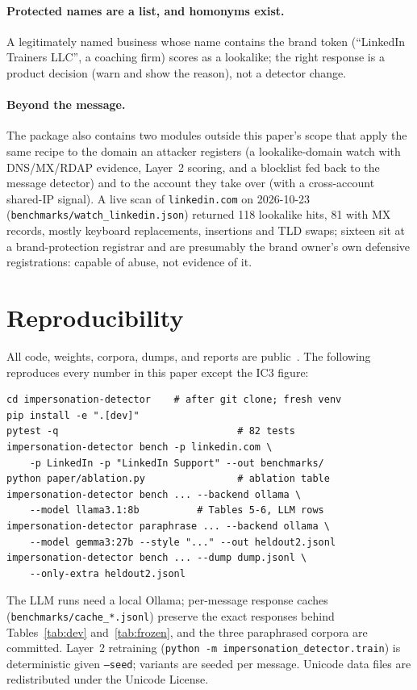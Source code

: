 \documentclass[10pt,twocolumn]{article}
\newcommand{\code}[1]{\texttt{#1}}
\begin{document}
\paragraph{Protected names are a list, and homonyms exist.} A legitimately named business whose name contains the brand token (``LinkedIn Trainers LLC'', a coaching firm) scores as a lookalike; the right response is a product decision (warn and show the reason), not a detector change.

\paragraph{Beyond the message.} The package also contains two modules outside this paper's scope that apply the same recipe to the domain an attacker registers (a lookalike-domain watch with DNS/MX/RDAP evidence, Layer~2 scoring, and a blocklist fed back to the message detector) and to the account they take over (with a cross-account shared-IP signal). A live scan of \code{linkedin.com} on 2026-10-23 (\code{benchmarks/watch\_linkedin.json}) returned 118 lookalike hits, 81 with MX records, mostly keyboard replacements, insertions and TLD swaps; sixteen sit at a brand-protection registrar and are presumably the brand owner's own defensive registrations: capable of abuse, not evidence of it.

\section{Reproducibility}
\label{sec:repro}

All code, weights, corpora, dumps, and reports are public~\cite{ezema2026detector}. The following reproduces every number in this paper except the IC3 figure:
{\footnotesize\begin{verbatim}
cd impersonation-detector    # after git clone; fresh venv
pip install -e ".[dev]"
pytest -q                               # 82 tests
impersonation-detector bench -p linkedin.com \
    -p LinkedIn -p "LinkedIn Support" --out benchmarks/
python paper/ablation.py                # ablation table
impersonation-detector bench ... --backend ollama \
    --model llama3.1:8b          # Tables 5-6, LLM rows
impersonation-detector paraphrase ... --backend ollama \
    --model gemma3:27b --style "..." --out heldout2.jsonl
impersonation-detector bench ... --dump dump.jsonl \
    --only-extra heldout2.jsonl
\end{verbatim}}
The LLM runs need a local Ollama; per-message response caches (\code{benchmarks/cache\_*.jsonl}) preserve the exact responses behind Tables~\ref{tab:dev} and~\ref{tab:frozen}, and the three paraphrased corpora are committed. Layer~2 retraining (\code{python -m impersonation\_detector.train}) is deterministic given \code{--seed}; variants are seeded per message. Unicode data files are redistributed under the Unicode License.
\end{document}

